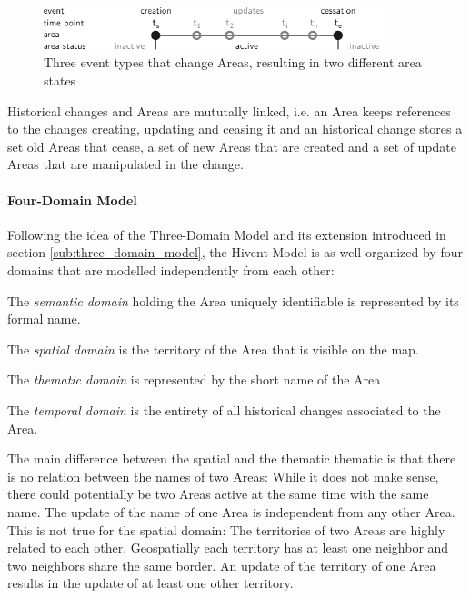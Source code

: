 \begin{figure}[H]
  \vspace{1em}
  \centering
  \includegraphics[width=0.9\textwidth]{graphics/development/hivent_model/area_states}
  \caption{Three event types that change Areas, resulting in two different area states}
  \label{fig:area_states}
\end{figure}

Historical changes and Areas are mututally linked, i.e. an Area keeps references to the changes creating, updating and ceasing it and an historical change stores a set old Areas that cease, a set of new Areas that are created and a set of update Areas that are manipulated in the change.


\paragraph{Four-Domain Model} %
\label{par:four_domain_model}

Following the idea of the Three-Domain Model and its extension introduced in section \ref{sub:three_domain_model}, the Hivent Model is as well organized by four domains that are modelled independently from each other:

\begin{compactitem}
  \item The \emph{semantic domain} holding the Area uniquely identifiable is represented by its formal name.
  \item The \emph{spatial domain} is the territory of the Area that is visible on the map.
  \item The \emph{thematic domain} is represented by the short name of the Area
  \item The \emph{temporal domain} is the entirety of all historical changes associated to the Area.
\end{compactitem}

The main difference between the spatial and the thematic thematic is that there is no relation between the names of two Areas: While it does not make sense, there could potentially be two Areas active at the same time with the same name. The update of the name of one Area is independent from any other Area. This is not true for the spatial domain: The territories of two Areas are highly related to each other. Geospatially each territory has at least one neighbor and two neighbors share the same border. An update of the territory of one Area results in the update of at least one other territory.

